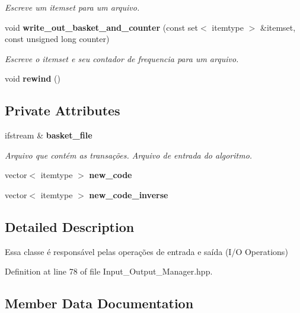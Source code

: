 \begin{CompactItemize}
\begin{CompactList}\small\item\em Escreve um itemset para um arquivo. \item\end{CompactList}\item 
void {\bf write\_\-out\_\-basket\_\-and\_\-counter} (const set$<$ itemtype $>$ \&itemset, const unsigned long counter)\label{classInput__Output__Manager_460117062808432662d5e7e79325d03f}

\begin{CompactList}\small\item\em Escreve o itemset e seu contador de frequencia para um arquivo. \item\end{CompactList}\item 
void \textbf{rewind} ()\label{classInput__Output__Manager_b8734e666421c9fe3b6380a818c6c727}

\end{CompactItemize}
\subsection*{Private Attributes}
\begin{CompactItemize}
\item 
ifstream \& {\bf basket\_\-file}\label{classInput__Output__Manager_e362f0acf7cbba2362139356ef51ce09}

\begin{CompactList}\small\item\em Arquivo que contém as transações. Arquivo de entrada do algoritmo. \item\end{CompactList}\item 
vector$<$ itemtype $>$ {\bf new\_\-code}
\item 
vector$<$ itemtype $>$ {\bf new\_\-code\_\-inverse}
\end{CompactItemize}


\subsection{Detailed Description}
Essa classe é responsável pelas operações de entrada e saída (I/O Operations) 



Definition at line 78 of file Input\_\-Output\_\-Manager.hpp.

\subsection{Member Data Documentation}
